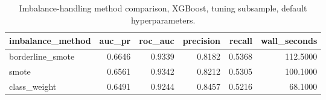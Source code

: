 \begin{table}
\caption{Imbalance-handling method comparison, XGBoost, tuning subsample, default hyperparameters.}
\label{tab:table15_imbalance_method_comparison}
\begin{tabular}{lrrrrr}
\toprule
imbalance\_method & auc\_pr & roc\_auc & precision & recall & wall\_seconds \\
\midrule
borderline\_smote & 0.6646 & 0.9339 & 0.8182 & 0.5368 & 112.5000 \\
smote & 0.6561 & 0.9342 & 0.8212 & 0.5305 & 100.1000 \\
class\_weight & 0.6491 & 0.9244 & 0.8457 & 0.5216 & 68.1000 \\
\bottomrule
\end{tabular}
\end{table}
